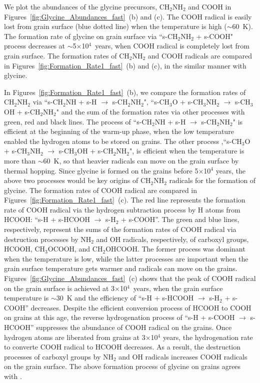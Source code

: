 \documentclass{aastex61}
\begin{document}
We plot the abundances of the glycine precursors, CH$_2$NH$_2$ and COOH in Figures~\ref{fig:Glycine_Abundances_fast}~(b) and (c).
%
The COOH radical is easily lost from grain surface (blue dotted line) when the temperature is high ($\sim$60~K).
%
The formation rate of glycine on grain surface via ``s-CH$_2$NH$_2$ + s-COOH" process decreases at $\sim$5$\times$10$^{4}$~years, when COOH radical is completely lost from grain surface.
%
The formation rates of CH$_2$NH$_2$ and COOH radicals are compared in Figures~\ref{fig:Formation_Rate1_fast}~(b) and (c), in the similar manner with glycine.
%


In Figures~\ref{fig:Formation_Rate1_fast}~(b), we compare the formation rates of CH$_2$NH$_2$ via ``s-CH$_2$NH + s-H $\longrightarrow$ s-CH$_2$NH$_2$", ``s-CH$_3$O + s-CH$_3$NH$_2$ $\longrightarrow$ s-CH$_3$OH + s-CH$_2$NH$_2$" and the sum of the formation rates via other processes with green, red and black lines. 
%
The process of ``s-CH$_2$NH + s-H $\longrightarrow$ s-CH$_2$NH$_2$" is efficient at the beginning of the warm-up phase, when the low temperature enabled the hydrogen atoms to be stored on grains.
%
The other process ,``s-CH$_3$O + s-CH$_3$NH$_2$ $\longrightarrow$ s-CH$_3$OH + s-CH$_2$NH$_2$", is efficient when the temperature is more than $\sim$60~K, so that heavier radicals can move on the grain surface by thermal hopping.
%
Since glycine is formed on the grains before 5$\times$10$^{4}$ years, the above two processes would be key origins of CH$_2$NH$_2$ radicals for the formation of glycine.
%
The formation rates of COOH radical are compared in Figures~\ref{fig:Formation_Rate1_fast}~(c).
%
The red line represents the formation rate of COOH radical via the hydrogen subtraction process by H atoms from HCOOH: ``s-H + s-HCOOH $\longrightarrow$ s-H$_2$ + s-COOH''.
%
The green and blue lines, respectively, represent the sums of the formation rates of COOH radical via destruction processes by NH$_2$ and OH radicals, respectively, of carboxyl groups, HCOOH, CH$_3$OCOOH, and CH$_2$OHCOOH.
%
The former process was dominant when the temperature is low, while the latter processes are important when the grain surface temperature gets warmer and radicals can move on the grains.
%
Figures~\ref{fig:Glycine_Abundances_fast}~(c) shows that the peak of COOH radical on the grain surface is achieved at 3$\times$10$^{4}$~years, when the grain surface temperature is $\sim$30~K and the efficiency of ``s-H + s-HCOOH $\longrightarrow$ s-H$_2$ + s-COOH'' decreases.
%
Despite the efficient conversion process of HCOOH to COOH on grains at this age, the reverse hydrogenation process of ``s-H + s-COOH $\longrightarrow$ s-HCOOH'' suppresses the abundance of COOH radical on the grains.
%
Once hydrogen atoms are liberated from grains at 3$\times$10$^{4}$ years, the hydrogenation rate to converte COOH radical to HCOOH decreases.
%
As a result, the destruction processes of carboxyl groups by NH$_2$ and OH radicals increases COOH radicals on the grain surface.
%
The above formation process of glycine on grains agrees with \cite{Garrod13}.
\end{document}
